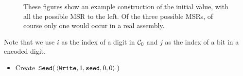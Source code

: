 \begin{figure}[H]
    \caption{\label{fig:initial_value_assemblies} These figures show an example construction of the initial value,
    with all the possible MSR to the left. Of the three possible MSRs, of course only one would occur in a real assembly.}
\end{figure}

Note that we use $i$ as the index of a digit in $\mathcal{C}_0$ and $j$ as the index of a bit
in a encoded digit.

\begin{itemize}
    \item Create
    $\begin{aligned}[t]
        {\tt Seed}(&\left\langle {\tt Write}, 1, {\tt seed}, 0, 0 \right\rangle \; )
    \end{aligned}$
\end{itemize}



